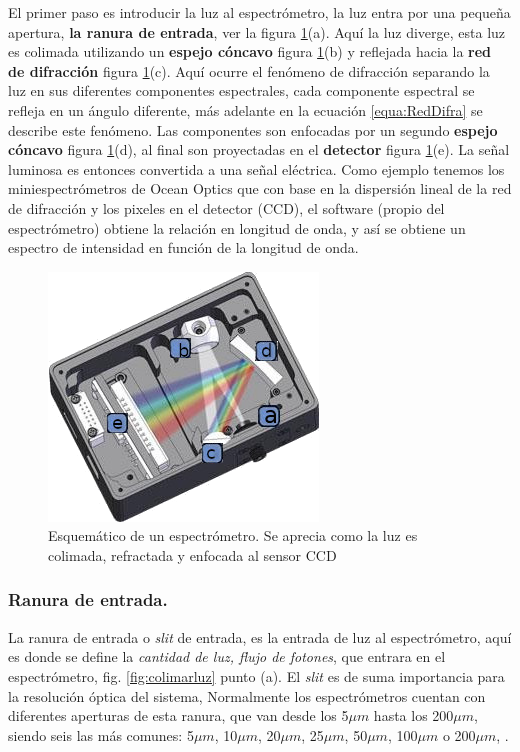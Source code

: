 El primer paso es introducir la luz al espectrómetro, la luz entra por una pequeña apertura, \textbf{la ranura de entrada}, ver la figura \ref{fig:esquematicoespectrometro}(a). Aquí la luz diverge, esta luz es colimada utilizando un \textbf{espejo cóncavo} figura \ref{fig:esquematicoespectrometro}(b) y reflejada hacia la \textbf{red de difracción} figura \ref{fig:esquematicoespectrometro}(c). Aquí ocurre el fenómeno de difracción separando la luz en sus diferentes componentes espectrales, cada componente espectral se refleja en un ángulo diferente, más adelante en la ecuación \ref{equa:RedDifra} se describe este fenómeno.  %
Las componentes son enfocadas por un segundo \textbf{espejo cóncavo} figura \ref{fig:esquematicoespectrometro}(d), al final son proyectadas en el \textbf{detector} figura \ref{fig:esquematicoespectrometro}(e). La señal luminosa es entonces convertida a una señal eléctrica. Como ejemplo tenemos los miniespectrómetros de Ocean Optics que con base en la dispersión lineal
de la red de difracción y los pixeles en el detector (CCD), el software (propio del espectrómetro) obtiene la relación en
longitud de onda, y así se obtiene un espectro de intensidad en función de la longitud de onda.

\begin{figure}[h]
	\centering
	\includegraphics[width=0.55\linewidth]{Imagenes/Espectrometro}
	\caption[Esquema de un espectrómetro.]{Esquemático de un espectrómetro. Se aprecia como la luz es colimada, refractada y enfocada al sensor CCD \cite{BWTEK}}
	\label{fig:esquematicoespectrometro}
\end{figure}

\subsubsection{Ranura de entrada.}
La ranura de entrada o \textit{slit} de entrada, es la entrada de luz al espectrómetro, aquí es donde se define la \textit{cantidad de luz, flujo de fotones}, que entrara en el espectrómetro, fig. \ref{fig:colimarluz} punto (a).
El \textit{slit} es de suma importancia para la resolución óptica del sistema, Normalmente los espectrómetros cuentan con diferentes aperturas de esta ranura, que van desde los 5$\mu m$ hasta los 200$\mu m$, siendo seis las más comunes: 5$\mu m$, 10$\mu m$, 20$\mu m$, 25$\mu m$, 50$\mu m$, 100$\mu m$ o 200$\mu m$, \cite{Oceana}.

